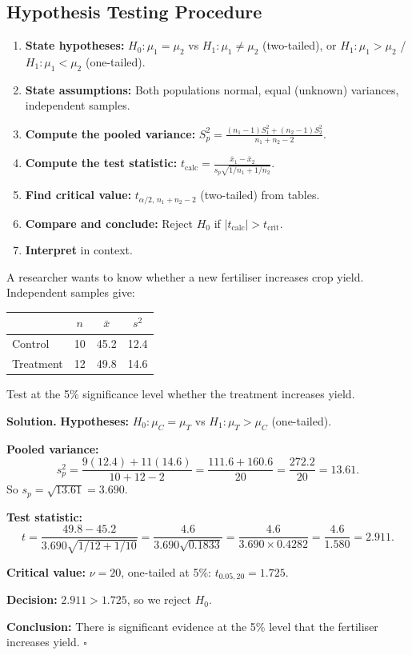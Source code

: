 \documentclass[12pt, a4paper, oneside]{book}
\theoremstyle{definition}
\theoremstyle{plain}
\theoremstyle{remark}
\newenvironment{solution}
  {\par\medskip\noindent\textbf{Solution.}\quad}
  {\hfill$\square$\par\medskip}
\begin{document}
\subsection{Hypothesis Testing Procedure}

\begin{enumerate}[label=\textbf{Step \arabic*:}]
  \item \textbf{State hypotheses:} $H_0:\mu_1=\mu_2$ vs
        $H_1:\mu_1\ne\mu_2$ (two-tailed), or
        $H_1:\mu_1>\mu_2$ / $H_1:\mu_1<\mu_2$ (one-tailed).
  \item \textbf{State assumptions:} Both populations normal, equal
        (unknown) variances, independent samples.
  \item \textbf{Compute the pooled variance:}
        $S_p^2 = \frac{(n_1-1)S_1^2+(n_2-1)S_2^2}{n_1+n_2-2}$.
  \item \textbf{Compute the test statistic:}
        $t_{\text{calc}} = \frac{\bar{x}_1-\bar{x}_2}{s_p\sqrt{1/n_1+1/n_2}}$.
  \item \textbf{Find critical value:} $t_{\alpha/2,\,n_1+n_2-2}$ (two-tailed)
        from tables.
  \item \textbf{Compare and conclude:} Reject $H_0$ if $|t_{\text{calc}}|>t_{\text{crit}}$.
  \item \textbf{Interpret} in context.
\end{enumerate}

\begin{workedexample}
A researcher wants to know whether a new fertiliser increases crop yield.
Independent samples give:
\begin{center}
\begin{tabular}{lccc}
\toprule
  & $n$ & $\bar{x}$ & $s^2$ \\
\midrule
Control   & 10 & 45.2 & 12.4 \\
Treatment & 12 & 49.8 & 14.6 \\
\bottomrule
\end{tabular}
\end{center}
Test at the 5\% significance level whether the treatment increases yield.

\begin{solution}
\textbf{Hypotheses:} $H_0:\mu_C=\mu_T$ vs $H_1:\mu_T>\mu_C$ (one-tailed).

\textbf{Pooled variance:}
\[
  s_p^2 = \frac{9(12.4)+11(14.6)}{10+12-2}
  = \frac{111.6+160.6}{20}
  = \frac{272.2}{20} = 13.61.
\]
So $s_p = \sqrt{13.61} = 3.690$.

\textbf{Test statistic:}
\[
  t = \frac{49.8-45.2}{3.690\sqrt{1/12+1/10}}
  = \frac{4.6}{3.690\sqrt{0.1833}}
  = \frac{4.6}{3.690\times 0.4282}
  = \frac{4.6}{1.580} = 2.911.
\]

\textbf{Critical value:} $\nu=20$, one-tailed at 5\%: $t_{0.05,20}=1.725$.

\textbf{Decision:} $2.911 > 1.725$, so we reject $H_0$.

\textbf{Conclusion:} There is significant evidence at the 5\% level that
the fertiliser increases yield.
\end{solution}
\end{workedexample}
\end{document}

